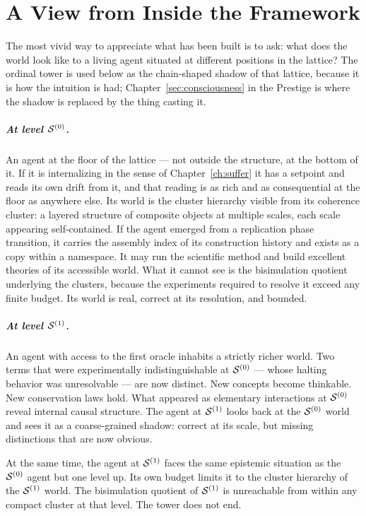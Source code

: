 \chapter*{A View from Inside the Framework}

The most vivid way to appreciate what has been built is to ask:
what does the world look like to a living agent situated at different
positions in the lattice?
The ordinal tower is used below as the chain-shaped shadow of that
lattice, because it is how the intuition is had;
Chapter~\ref{sec:consciousness} in the Prestige is where the shadow is
replaced by the thing casting it.

\paragraph{At level $\mathcal{S}^{(0)}$.}
An agent at the floor of the lattice --- not outside the structure, at the
bottom of it.
If it is internalizing in the sense of
Chapter~\ref{ch:suffer} it has a setpoint and reads its own drift from
it, and that reading is as rich and as consequential at the floor as
anywhere else.
Its world is the cluster hierarchy visible from its coherence
cluster: a layered structure of composite objects at multiple
scales, each scale appearing self-contained.
If the agent emerged from a replication phase transition, it
carries the assembly index of its construction history and exists
as a copy within a namespace.
It may run the scientific method and build excellent theories of
its accessible world.
What it cannot see is the bisimulation quotient underlying the
clusters, because the experiments required to resolve it exceed
any finite budget.
Its world is real, correct at its resolution, and bounded.

\paragraph{At level $\mathcal{S}^{(1)}$.}
An agent with access to the first oracle inhabits a strictly
richer world.
Two terms that were experimentally indistinguishable at
$\mathcal{S}^{(0)}$ --- whose halting behavior was unresolvable ---
are now distinct.
New concepts become thinkable.
New conservation laws hold.
What appeared as elementary interactions at $\mathcal{S}^{(0)}$ reveal
internal causal structure.
The agent at $\mathcal{S}^{(1)}$ looks back at the $\mathcal{S}^{(0)}$ world and
sees it as a coarse-grained shadow: correct at its scale, but
missing distinctions that are now obvious.

At the same time, the agent at $\mathcal{S}^{(1)}$ faces the same
epistemic situation as the $\mathcal{S}^{(0)}$ agent but one level up.
Its own budget limits it to the cluster hierarchy of the
$\mathcal{S}^{(1)}$ world.
The bisimulation quotient of $\mathcal{S}^{(1)}$ is unreachable from
within any compact cluster at that level.
The tower does not end.

